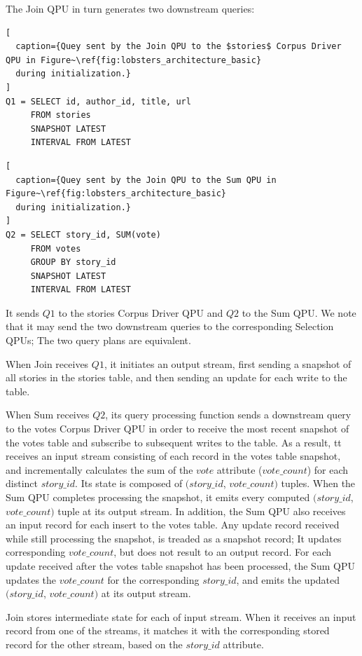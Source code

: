 The Join QPU in turn generates two downstream queries:

\begin{lstlisting}[
  caption={Quey sent by the Join QPU to the $stories$ Corpus Driver QPU in Figure~\ref{fig:lobsters_architecture_basic}
  during initialization.}
]
Q1 = SELECT id, author_id, title, url
     FROM stories
     SNAPSHOT LATEST
     INTERVAL FROM LATEST
\end{lstlisting}

\begin{lstlisting}[
  caption={Quey sent by the Join QPU to the Sum QPU in Figure~\ref{fig:lobsters_architecture_basic}
  during initialization.}
]
Q2 = SELECT story_id, SUM(vote)
     FROM votes
     GROUP BY story_id
     SNAPSHOT LATEST
     INTERVAL FROM LATEST
\end{lstlisting}

\noindent
It sends $Q1$ to the stories Corpus Driver QPU and $Q2$ to the Sum QPU.
We note that it may send the two downstream queries to the corresponding Selection QPUs;
The two query plans are equivalent.

\smallskip
\noindent
When Join receives $Q1$, it initiates an output stream,
first sending a snapshot of all stories in the stories table,
and then sending an update for each write to the table.

\smallskip
\noindent
When Sum receives $Q2$, its query processing function sends a downstream query to the votes Corpus Driver QPU
in order to receive the most recent snapshot of the votes table and subscribe to subsequent writes to the table.
As a result, tt receives an input stream consisting of each record in the votes table snapshot,
and incrementally calculates the sum of the $vote$ attribute ($vote\_count$) for each distinct $story\_id$.
Its state is composed of $(story\_id$, $vote\_count)$ tuples.
When the Sum QPU completes processing the snapshot, it emits every computed $(story\_id$, $vote\_count)$ tuple
at its output stream.
In addition, the Sum QPU also receives an input record for each insert to the votes table.
Any update record received while still processing the snapshot, is treaded as a snapshot record;
It updates corresponding $vote\_count$, but does not result to an output record.
For each update received after the votes table snapshot has been processed,
the Sum QPU updates the $vote\_count$ for the corresponding $story\_id$,
and emits the updated $(story\_id$, $vote\_count)$ at its output stream.

\smallskip
\noindent
Join stores intermediate state for each of input stream.
When it receives an input record from one of the streams,
it matches it with the corresponding stored record for the other stream,
based on the $story\_id$ attribute.

